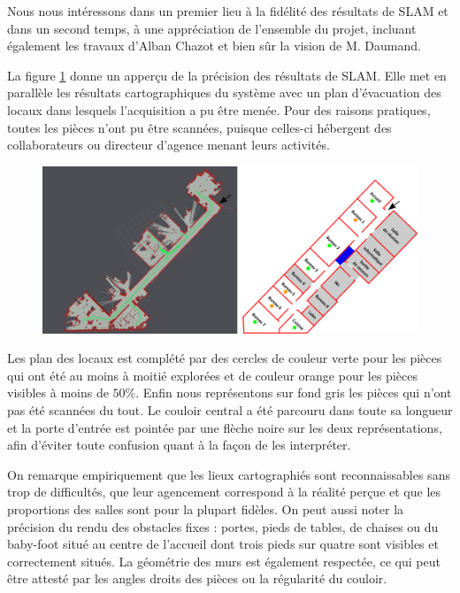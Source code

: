  Nous nous intéressons dans un premier lieu à la fidélité des résultats de SLAM et dans un second temps, à une appréciation de l'ensemble du projet, incluant également les travaux d'Alban Chazot et bien sûr la vision de M. Daumand.  
  
  La figure \ref{fig:carto} donne un apperçu de la précision des résultats de SLAM. 
  Elle met en parallèle les résultats cartographiques du système avec un plan d'évacuation des locaux dans lesquels l'acquisition a pu être menée. 
  Pour des raisons pratiques, toutes les pièces n'ont pu être scannées, puisque celles-ci hébergent des collaborateurs ou directeur d'agence menant leurs activités.
  
  \begin{figure}[h]
    \centering
      \includegraphics[width=1.\linewidth]{figures/plan}  
    \label{fig:carto}
  \end{figure}
  
  Les plan des locaux est complété par des cercles de couleur verte pour les pièces qui ont été au moins à moitié explorées et de couleur orange pour les pièces visibles à moins de $50\%$. 
  Enfin nous représentons sur fond gris les pièces qui n'ont pas été scannées du tout. 
  Le couloir central a été parcouru dans toute sa longueur et la porte d'entrée est pointée par une flèche noire sur les deux représentations, afin d'éviter toute confusion quant à la façon de les interpréter. 
  
  On remarque empiriquement que les lieux cartographiés sont reconnaissables sans trop de difficultés, que leur agencement correspond à la réalité perçue et que les proportions des salles sont pour la plupart fidèles. 
  On peut aussi noter la précision du rendu des obstacles fixes : portes, pieds de tables, de chaises ou du baby-foot situé au centre de l'accueil dont trois pieds sur quatre sont visibles et correctement situés. 
  La géométrie des murs est également respectée, ce qui peut être attesté par les angles droits des pièces ou la régularité du couloir. 
  
